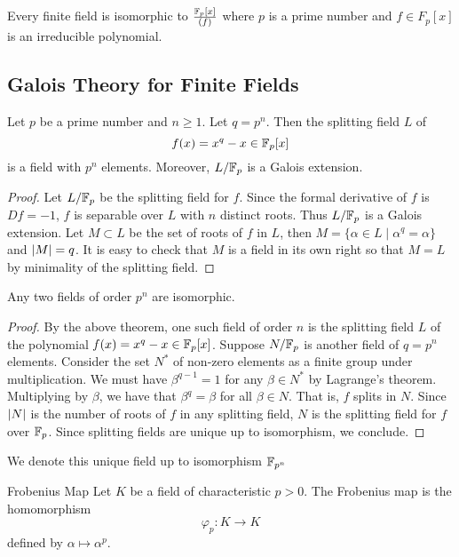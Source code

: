 \documentclass[a4paper]{article}
\begin{document}
\begin{prp}{}{} Every finite field is isomorphic to $\frac{\mathbb{F}_p[x]}{(f)}$ where $p$ is a prime number and $f\in F_p[x]$ is an irreducible polynomial. 
\end{prp}

\subsection{Galois Theory for Finite Fields}
\begin{thm}{}{} Let $p$ be a prime number and $n\geq 1$. Let $q=p^n$. Then the splitting field $L$ of $$f(x)=x^q-x\in \mathbb{F}_p[x]$$ is a field with $p^n$ elements. Moreover, $L/\mathbb{F}_p$ is a Galois extension. 
\begin{proof}
Let $L/\mathbb{F}_p$ be the splitting field for $f$. Since the formal derivative of $f$ is $Df=-1$, $f$ is separable over $L$ with $n$ distinct roots. Thus $L/\mathbb{F}_p$ is a Galois extension. Let $M\subset L$ be the set of roots of $f$ in $L$, then $M=\{\alpha\in L\;|\;\alpha^q=\alpha\}$ and $\abs{M}=q$. It is easy to check that $M$ is a field in its own right so that $M=L$ by minimality of the splitting field. 
\end{proof}
\end{thm}

\begin{prp}{}{} Any two fields of order $p^n$ are isomorphic. 
\begin{proof}
By the above theorem, one such field of order $n$ is the splitting field $L$ of the polynomial $f(x)=x^q-x\in\mathbb{F}_p[x]$. Suppose $N/\mathbb{F}_p$ is another field of $q=p^n$ elements. Consider the set $N^\ast$ of non-zero elements as a finite group under multiplication. We must have $\beta^{q-1}=1$ for any $\beta\in N^\ast$ by Lagrange's theorem. Multiplying by $\beta$, we have that $\beta^q=\beta$ for all $\beta\in N$. That is, $f$ splits in $N$. Since $\abs{N}$ is the number of roots of $f$ in any splitting field, $N$ is the splitting field for $f$ over $\mathbb{F}_p$. Since splitting fields are unique up to isomorphism, we conclude. 
\end{proof}
\end{prp}

We denote this unique field up to isomorphism $\mathbb{F}_{p^n}$

\begin{defn}{Frobenius Map}{} Let $K$ be a field of characteristic $p>0$. The Frobenius map is the homomorphism $$\varphi_p:K\to K$$ defined by $\alpha\mapsto\alpha^p$. 
\end{defn}
\end{document}
